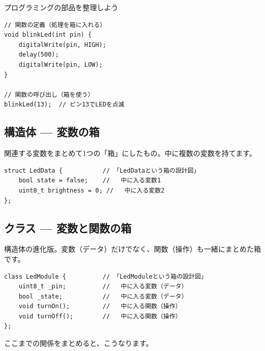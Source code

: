 \begin{qabox}{プログラミングの部品を整理しよう}
\begin{lstlisting}
// 関数の定義（処理を箱に入れる）
void blinkLed(int pin) {
    digitalWrite(pin, HIGH);
    delay(500);
    digitalWrite(pin, LOW);
}

// 関数の呼び出し（箱を使う）
blinkLed(13);  // ピン13でLEDを点滅
\end{lstlisting}

\subsection{構造体 — 変数の箱}

関連する変数をまとめて1つの「箱」にしたもの。中に複数の変数を持てます。

\begin{lstlisting}
struct LedData {           // 「LedDataという箱の設計図」
    bool state = false;    //   中に入る変数1
    uint8_t brightness = 0; //   中に入る変数2
};
\end{lstlisting}

\subsection{クラス — 変数と関数の箱}

構造体の進化版。変数（データ）だけでなく、関数（操作）も一緒にまとめた箱です。

\begin{lstlisting}
class LedModule {          // 「LedModuleという箱の設計図」
    uint8_t _pin;          //   中に入る変数（データ）
    bool _state;           //   中に入る変数（データ）
    void turnOn();         //   中に入る関数（操作）
    void turnOff();        //   中に入る関数（操作）
};
\end{lstlisting}

\vspace{2mm}
ここまでの関係をまとめると、こうなります。

\begin{center}
\end{center}
\end{qabox}

